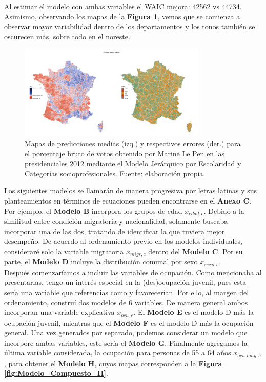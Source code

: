 Al estimar el modelo con ambas variables el WAIC mejora: 42562 vs 44734. Asimismo, observando los mapas de la \textbf{Figura \ref{fig:Modelo_Compuesto_A}}, vemos que se comienza a observar mayor variabilidad dentro de los departamentos y los tonos también se oscurecen más, sobre todo en el noreste.\\ 

\begin{figure}[h]
	\centering
	\includegraphics[width = 0.8\textwidth]{Figs/Modelado/Modelo_Compuesto_A}
	\caption{Mapas de predicciones medias (izq.) y respectivos errores (der.) para el porcentaje bruto de votos obtenido por Marine Le Pen en las presidenciales 2012 mediante el Modelo Jerárquico por Escolaridad y Categorías socioprofesionales. Fuente: elaboración propia.}
	\label{fig:Modelo_Compuesto_A}
\end{figure}

Los siguientes modelos se llamarán de manera progresiva por letras latinas y sus planteamientos en términos de ecuaciones pueden encontrarse en el \textbf{Anexo C}. Por ejemplo, el \textbf{Modelo B} incorpora los grupos de edad $x_{edad,c}$. Debido a la similitud entre condición migratoria y nacionalidad, solamente buscaba incorporar una de las dos, tratando de identificar la que tuviera mejor desempeño. De acuerdo al ordenamiento previo en los modelos individuales, consideraré solo la variable migratoria $x_{migr,c}$ dentro del \textbf{Modelo C}. Por su parte, el \textbf{Modelo D} incluye la distribución comunal por sexo $x_{sexo,c}$.\\

Después comenzaríamos a incluir las variables de ocupación. Como mencionaba al presentarlas, tengo un interés especial en la (des)ocupación juvenil, pues esta sería una variable que referencias como \textcite{LeBras16} y \textcite{Perrineau07} favorecerían. Por ello, al margen del ordenamiento, construí dos modelos de 6 variables. De manera general ambos incorporan una variable explicativa $x_{ocu,c}$. El \textbf{Modelo E} es el modelo D más la ocupación juvenil, mientras que el \textbf{Modelo F} es el modelo D más la ocupación general. Una vez generados por separado, podemos considerar un modelo que incorpore ambas variables, este sería el \textbf{Modelo G}. Finalmente agregamos la última variable considerada, la ocupación para personas de 55 a 64 años $x_{ocu\_may,c}$, para obtener el \textbf{Modelo H}, cuyos mapas corresponden a la \textbf{Figura \ref{fig:Modelo_Compuesto_H}}.\\

